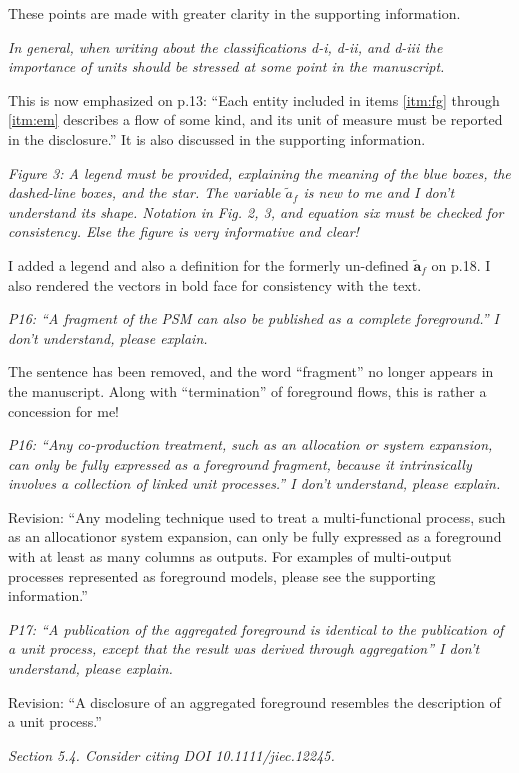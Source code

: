 \documentclass[11pt,letterpaper]{article}
\begin{document}
These points are made with greater clarity in the supporting information.

\emph{In general, when writing about the classifications d-i, d-ii, and d-iii the importance of units should be stressed at some point in the manuscript.}

This is now emphasized on p.13: ``Each entity included in items \ref{itm:fg} through \ref{itm:em} describes a flow of some kind, and its unit of measure must be reported in the disclosure.''  It is also discussed in the supporting information.

\emph{Figure 3: A legend must be provided, explaining the meaning of the blue boxes, the dashed-line boxes, and the star. The variable $\tilde{a}_f$ is new to me and I don’t understand its shape. Notation in Fig. 2, 3, and equation six must be checked for consistency. Else the figure is very informative and clear!}

I added a legend and also a definition for the formerly un-defined $\tilde{\mathbf{a}}_f$ on p.18.  I also rendered the vectors in bold face for consistency with the text.

\emph{P16: “A fragment of the PSM can also be published as a complete foreground.” I don’t understand, please explain.}

The sentence has been removed, and the word ``fragment'' no longer appears in the manuscript.  Along with ``termination'' of foreground flows, this is rather a concession for me!

\emph{P16: “Any co-production treatment, such as an allocation or system expansion, can only be fully expressed as a foreground fragment, because it intrinsically involves a collection of linked unit processes.” I don’t understand, please explain.}

Revision: ``Any modeling technique used to treat a multi-functional process, such as an allocationor system expansion, can only be fully expressed as a foreground with at least as many columns as
outputs. For examples of multi-output processes represented as foreground models, please see the
supporting information.''

\emph{P17: “A publication of the aggregated foreground is identical to the publication of a unit process, except that the result was derived through aggregation” I don’t understand, please explain.}

Revision: ``A disclosure of an aggregated foreground resembles the description of a unit process.''

\emph{Section 5.4. Consider citing DOI 10.1111/jiec.12245.}
\end{document}
